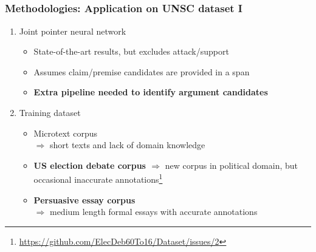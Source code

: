 \documentclass{beamer}
\begin{document}
\subsection{}
\begin{framefont}{\footnotesize}
	\begin{frame}
	\frametitle{Methodologies: Application on UNSC dataset I}
	\begin{enumerate}
	    \setlength\itemsep{1.5em}
		[square]
	    \item Joint pointer neural network \citep{potash2016heres}
	    \begin{itemize}
	    	\setlength\itemsep{1em}
	        \item State-of-the-art results, but excludes attack/support
	        \item Assumes claim/premise candidates are provided in a span
	        \item \textbf{Extra pipeline needed to identify argument candidates}
	    \end{itemize}
	    \item Training dataset
	    \begin{itemize}
	    	\setlength\itemsep{1em}
	    	\item Microtext corpus \citep{peldszus2015annotated} \\
	    	$\Longrightarrow$ short texts and lack of domain knowledge
	        \item \textbf{US election debate corpus \citep{haddadan-etal-2019-yes}} $\Longrightarrow$ new corpus in political domain, but occasional inaccurate annotations\footnote{\url{https://github.com/ElecDeb60To16/Dataset/issues/2}}
	        \item \textbf{Persuasive essay corpus \citep{stab2017parsing}} \\
	        $\Longrightarrow$ medium length formal essays with accurate annotations
	    \end{itemize}
	\end{enumerate}
	\end{frame}
\end{framefont}
\end{document}
